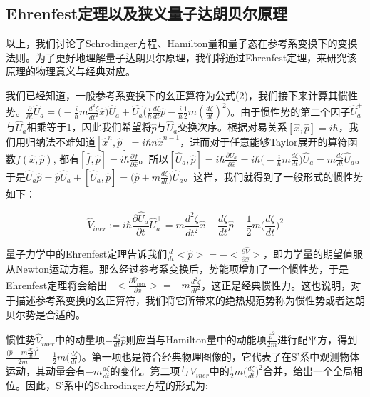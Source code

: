\documentclass[a4paper]{article}
\begin{document}
    \subsection{Ehrenfest定理以及狭义量子达朗贝尔原理}

        以上，我们讨论了Schrodinger方程、Hamilton量和量子态在参考系变换下的变换法则。为了更好地理解量子达朗贝尔原理，我们将通过Ehrenfest定理，来研究该原理的物理意义与经典对应。

        我们已经知道，一般参考系变换下的幺正算符为公式(2)，我们接下来计算其惯性势。$\frac{\partial}{\partial t}\hat{U}_a = \big(-\frac{i}{\hbar}m\frac{d^2 \zeta}{dt^2} \hat{x}\big)\hat{U}_a + \hat{U_a}\big(\frac{i}{\hbar}\frac{d\zeta}{dt}\hat{p} - \frac{i}{\hbar}\frac{1}{2}m(\frac{d\zeta}{dt})^2\big)$。由于惯性势的第二个因子$\hat{U}_a^+$与$\hat{U}_a$相乘等于1，因此我们希望将$\hat{p}$与$\hat{U}_a$交换次序。根据对易关系$[\hat{x},\hat{p}]=i\hbar$，我们用归纳法不难知道$[\hat{x}^n,\hat{p}]=i\hbar n\hat{x}^{n-1}$，进而对于任意能够Taylor展开的算符函数$f(\hat{x},\hat{p})$, 都有$[\hat{f}, \hat{p}]=i\hbar\frac{\partial f}{\partial\hat{x}}$。所以$[\hat{U}_a, \hat{p}] = i\hbar\frac{\partial\hat{U}_a}{\partial\hat{x}} = i\hbar\big(-\frac{i}{\hbar}m\frac{d\zeta}{dt}\big)\hat{U}_a = m\frac{d\zeta}{dt}\hat{U}_a$。于是$\hat{U}_a\hat{p} = \hat{p}\hat{U}_a + [\hat{U}_a, \hat{p}] = \big(\hat{p}+m\frac{d\zeta}{dt}\big)\hat{U}_a$。这样，我们就得到了一般形式的惯性势如下：

        \begin{equation}
            \hat{V}_{iner} := i\hbar\frac{\partial\hat{U}_a}{\partial t}\hat{U}_a^+ = m \frac{d^2\zeta}{d t^2}\hat{x}-\frac{d\zeta}{dt}\hat{p}-\frac{1}{2}m\bigg(\frac{d\zeta}{dt}\bigg)^2
        \end{equation}

        量子力学中的Ehrenfest定理告诉我们$\frac{d}{dt}<\hat{p}>=-<\frac{\partial\hat{V}}{\partial \hat{x}}>$，即力学量的期望值服从Newton运动方程。那么经过参考系变换后，势能项增加了一个惯性势，于是Ehrenfest定理将会给出$-<\frac{\partial\hat{V}_{iner}}{\partial \hat{x}}>=-m \frac{d^2\zeta}{d t^2}$，这正是经典惯性力。这也说明，对于描述参考系变换的幺正算符，我们将它所带来的绝热规范势称为惯性势或者达朗贝尔势是合适的。

        惯性势$\hat{V}_{iner}$中的动量项$-\frac{d\zeta}{dt}\hat{p}$则应当与Hamilton量中的动能项$\frac{\hat{p}^2}{2m}$进行配平方，得到$\frac{\big(\hat{p}-m\frac{d\zeta}{dt}\big)^2}{2m}-\frac{1}{2}m\big(\frac{d\zeta}{dt}\big)$。第一项也是符合经典物理图像的，它代表了在S'系中观测物体运动，其动量会有$-m\frac{d\zeta}{dt}$的变化。第二项与$V_{iner}$中的$\frac{1}{2}m\big(\frac{d\zeta}{dt}\big)^2$合并，给出一个全局相位。因此，S'系中的Schrodinger方程的形式为:
\end{document}
